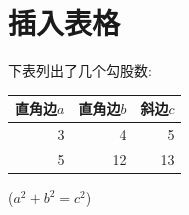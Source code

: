 \documentclass[UTF8]{ctexart}
\begin{document}
    \section{插入表格}
      下表列出了几个勾股数:
      \begin{table}[H]%
        \begin{tabular}{|rrr|}%
          \hline%
          直角边$a$ & 直角边$b$ & 斜边$c$ \\%
          \hline
          3& 4& 5\\%
          5& 12& 13\\
          \hline
        \end{tabular}%
        \qquad%
        ($a^2 + b^2 = c^2$)
      \end{table}
  \nocite{Shiye}%
\end{document}
